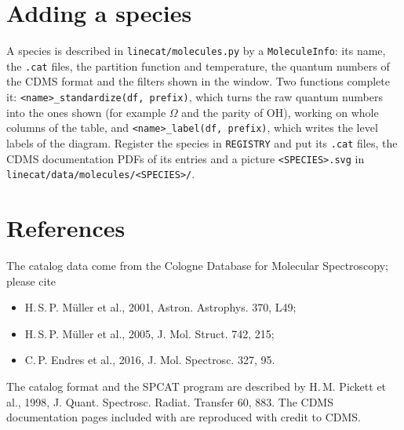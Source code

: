 \documentclass[11pt]{article}
\begin{document}
\section{Adding a species}

A species is described in \texttt{linecat/molecules.py} by a \texttt{MoleculeInfo}: its name, the
\texttt{.cat} files, the partition function and temperature, the quantum numbers of the CDMS
format and the filters shown in the window. Two functions complete it:
\texttt{<name>\_standardize(df, prefix)}, which turns the raw quantum numbers into the ones shown
(for example $\Omega$ and the parity of OH), working on whole columns of the table, and
\texttt{<name>\_label(df, prefix)}, which writes the level labels of the diagram. Register the
species in \texttt{REGISTRY} and put its \texttt{.cat} files, the CDMS documentation PDFs of its
entries and a picture \texttt{<SPECIES>.svg} in \texttt{linecat/data/molecules/<SPECIES>/}.

\section*{References}
The catalog data come from the Cologne Database for Molecular Spectroscopy; please cite
\begin{itemize}[nosep]
  \item H.\,S.\,P. Müller et al., 2001, Astron. Astrophys. 370, L49;
  \item H.\,S.\,P. Müller et al., 2005, J. Mol. Struct. 742, 215;
  \item C.\,P. Endres et al., 2016, J. Mol. Spectrosc. 327, 95.
\end{itemize}
The catalog format and the SPCAT program are described by H.\,M. Pickett et al., 1998,
J. Quant. Spectrosc. Radiat. Transfer 60, 883. The CDMS documentation pages included with
\AppName{} are reproduced with credit to CDMS.

\newpage
\appendix

\end{document}
